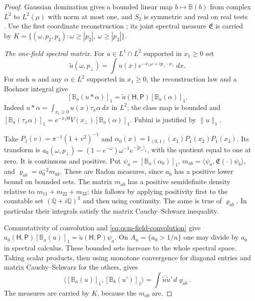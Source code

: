 \documentclass[11pt,letterpaper,reqno]{amsart}
\theoremstyle{definition}
\begin{document}
\begin{proof}
Gaussian domination gives a bounded linear map
$b\mapsto\mathbb B(b)$ from complex $L^2$ to $L^2(\mu)$ with norm
at most one, and $S_2$ is symmetric and real on real tests
\cite[Proposition~5.1]{QEDConstruction}. Use the first coordinate reconstruction
\cite[Propositions~7.1--7.2]{QEDConstruction}; its joint spectral measure
$\mathfrak E$ is carried by
$K=\{(\omega,p_2,p_3):\omega\ge|p_2|,\ \omega\ge|p_3|\}$.

\emph{The one-field spectral matrix.}
For $u\in L^1\cap L^2$ supported in $x_1\ge0$ set
\[
 \widetilde u(\omega,p_\perp)
 =\int u(x)e^{-x_1\omega+ip_\perp\cdot x_\perp}\,dx.
\]
For such $u$ and any $\alpha\in L^2$ supported in $x_1\ge0$,
the reconstruction law and a Bochner integral give
\begin{equation}\label{eq:qcm-field-convolution}
 [\mathbb B_a(u*\alpha)]_1
 =\widetilde u(\mathsf H,\mathsf P)[\mathbb B_a(\alpha)]_1.
\end{equation}
Indeed $u*\alpha=\int_{x_1\ge0}u(x)\tau_x\alpha\,dx$ in $L^2$;
the class map is bounded and
$[\mathbb B_a(\tau_x\alpha)]_1=e^{-x_1\mathsf H}V(x_\perp)
[\mathbb B_a(\alpha)]_1$. Fubini is justified by $\|u\|_1$.

Take $P_1(v)=\pi^{-1}(1+v^2)^{-1}$ and
$\alpha_0(x)=1_{(0,1)}(x_1)P_1(x_2)P_1(x_3)$.
Its transform is
$a_0(\omega,p_\perp)=(1-e^{-\omega})\omega^{-1}e^{-|p_\perp|_1}$,
with the quotient equal to one at zero. It is continuous and positive.
Put $\psi_a=[\mathbb B_a(\alpha_0)]_1$,
$m_{ab}=\langle\psi_a,\mathfrak E(\cdot)\psi_b\rangle$, and
$\varrho_{ab}=a_0^{-2}m_{ab}$.
These are Radon measures, since $a_0$ has a positive lower bound on
bounded sets. The matrix $m_{ab}$ has a positive semidefinite density
relative to $m_{11}+m_{22}+m_{33}$: this follows by applying positivity
first to the countable set $(\mathbb Q+i\mathbb Q)^3$ and then using
continuity. The same is true of $\varrho_{ab}$. In particular their
integrals satisfy the matrix Cauchy--Schwarz inequality.

Commutativity of convolution and \eqref{eq:qcm-field-convolution} give
$a_0(\mathsf H,\mathsf P)[\mathbb B_a(u)]_1
=\widetilde u(\mathsf H,\mathsf P)\psi_a$.
On $A_n=\{a_0>1/n\}$ one may divide by $a_0$ in spectral calculus.
These bounded sets increase to the whole spectral space. Taking scalar
products, then using monotone convergence for diagonal entries and
matrix Cauchy--Schwarz for the others, gives
\begin{equation}\label{eq:qcm-spectral-matrix}
 \langle[\mathbb B_a(u)]_1,[\mathbb B_b(u')]_1\rangle
 =\int\overline{\widetilde u}\widetilde u'\,d\varrho_{ab}.
\end{equation}
The measures are carried by $K$, because the $m_{ab}$ are.


\end{proof}
\end{document}
